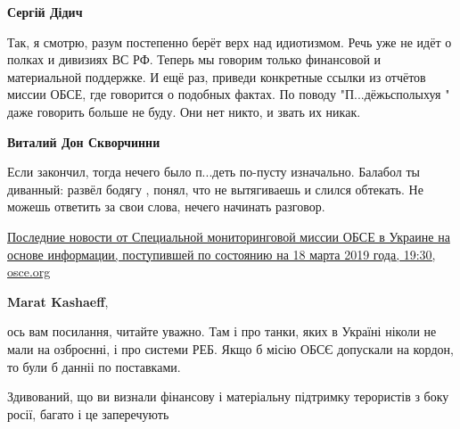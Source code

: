 \begin{itemize}
\begin{itemize}
\textbf{Сергій Дідич} 

Так, я смотрю, разум постепенно берёт верх над идиотизмом. Речь уже не идёт о
полках и дивизиях ВС РФ. Теперь мы говорим только финансовой и материальной
поддержке. И ещё раз, приведи конкретные ссылки из отчётов миссии ОБСЕ, где
говорится о подобных фактах. По поводу "П...дёжьсполыхуя " даже говорить больше
не буду. Они нет никто, и звать их никак.


 
\textbf{Виталий Дон Скворчинни} 

Если закончил, тогда нечего было п...деть по-пусту изначально. Балабол ты
диванный: развёл бодягу , понял, что не вытягиваешь и слился обтекать. Не
можешь ответить за свои слова, нечего начинать разговор.

 

\href{https://www.osce.org/ru/special-monitoring-mission-to-ukraine/414785}{%
Последние новости от Специальной мониторинговой миссии ОБСЕ в Украине на основе информации, поступившей по состоянию на 18 марта 2019 года, 19:30, osce.org%
}

 
\textbf{Marat Kashaeff}, 

ось вам посилання, читайте уважно. Там і про танки, яких в Україні ніколи не
мали на озброєнні, і про системи РЕБ. Якщо б місію ОБСЄ допускали на кордон, то
були б данніі по поставками.

Здивований, що ви визнали фінансову і матеріальну підтримку терористів з боку
росії, багато і це заперечують


 

\end{itemize}
\end{itemize}
